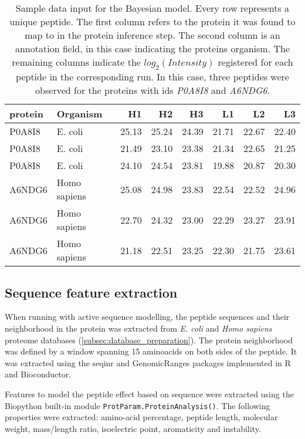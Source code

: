 \begin{table}
\begin{tabular}{llrrrrrr}
\toprule
protein &      Organism &     H1 &     H2 &     H3 &     L1 &     L2 &     L3 \\
\midrule
 P0A8I8 &       E. coli &  25.13 &  25.24 &  24.39 &  21.71 &  22.67 &  22.40 \\
 P0A8I8 &       E. coli &  21.49 &  23.10 &  23.38 &  21.34 &  22.65 &  21.25 \\
 P0A8I8 &       E. coli &  24.10 &  24.54 &  23.81 &  19.88 &  20.87 &  20.30 \\
 A6NDG6 &  Homo sapiens &  25.08 &  24.98 &  23.83 &  22.54 &  22.52 &  24.96 \\
 A6NDG6 &  Homo sapiens &  22.70 &  24.32 &  23.00 &  22.29 &  23.27 &  23.91 \\
 A6NDG6 &  Homo sapiens &  21.18 &  22.51 &  23.25 &  22.30 &  21.75 &  23.61 \\
\bottomrule
\end{tabular}
\caption[BayesQuant data input]{Sample data input for the Bayesian model. Every row represents a unique peptide. The first column refers to the protein it was found to map to in the protein inference step. The second column is an annotation field, in this case indicating the protein\textquotesingle s organism. The remaining columns indicate the $log_2(Intensity)$ registered for each peptide in the corresponding run. In this case, three peptides were observed for the proteins with ids \textit{P0A8I8} and \textit{A6NDG6}.}
\label{tab:data_model}
\end{table}

\subsection{Sequence feature extraction}

When running with active sequence modelling, the peptide sequences and their neighborhood in the protein was extracted from \textit{E. coli} and \textit{Homo sapiens} proteome databases (\ref{subsec:database_preparation}). The protein neighborhood was defined by a window spanning 15 aminoacids on both sides of the peptide. It was extracted using the seqinr \cite{Charif2007} and GenomicRanges \cite{Lawrence2013} packages implemented in R and Bioconductor.

Features to model the peptide effect based on sequence were extracted using the Biopython \cite{Cock2009} built-in  module \texttt{ProtParam.ProteinAnalysis()}. The following properties were extracted: amino-acid percentage, peptide length, molecular weight, mass/length ratio, isoelectric point, aromaticity and instability.

